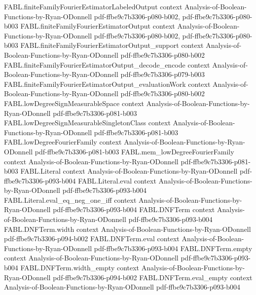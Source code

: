 \begin{theorem}
\proofstep
  {FABL.finiteFamilyFourierEstimatorLabeledOutput}
  {context}
  {Analysis-of-Boolean-Functions-by-Ryan-ODonnell}
  {pdf-ffbe9c7b3306-p080-b002,
    pdf-ffbe9c7b3306-p080-b003}
\proofstep
  {FABL.finiteFamilyFourierEstimatorOutput}
  {context}
  {Analysis-of-Boolean-Functions-by-Ryan-ODonnell}
  {pdf-ffbe9c7b3306-p080-b002,
    pdf-ffbe9c7b3306-p080-b003}
\proofstep
  {FABL.finiteFamilyFourierEstimatorOutput_support}
  {context}
  {Analysis-of-Boolean-Functions-by-Ryan-ODonnell}
  {pdf-ffbe9c7b3306-p080-b002}
\proofstep
  {FABL.finiteFamilyFourierEstimatorOutput_decode_encode}
  {context}
  {Analysis-of-Boolean-Functions-by-Ryan-ODonnell}
  {pdf-ffbe9c7b3306-p079-b003}
\proofstep
  {FABL.finiteFamilyFourierEstimatorOutput_evaluationWork}
  {context}
  {Analysis-of-Boolean-Functions-by-Ryan-ODonnell}
  {pdf-ffbe9c7b3306-p080-b002}
\proofstep
  {FABL.lowDegreeSignMeasurableSpace}
  {context}
  {Analysis-of-Boolean-Functions-by-Ryan-ODonnell}
  {pdf-ffbe9c7b3306-p081-b003}
\proofstep
  {FABL.lowDegreeSignMeasurableSingletonClass}
  {context}
  {Analysis-of-Boolean-Functions-by-Ryan-ODonnell}
  {pdf-ffbe9c7b3306-p081-b003}
\proofstep
  {FABL.lowDegreeFourierFamily}
  {context}
  {Analysis-of-Boolean-Functions-by-Ryan-ODonnell}
  {pdf-ffbe9c7b3306-p081-b003}
\proofstep
  {FABL.mem_lowDegreeFourierFamily}
  {context}
  {Analysis-of-Boolean-Functions-by-Ryan-ODonnell}
  {pdf-ffbe9c7b3306-p081-b003}
\proofstep
  {FABL.Literal}
  {context}
  {Analysis-of-Boolean-Functions-by-Ryan-ODonnell}
  {pdf-ffbe9c7b3306-p093-b004}
\proofstep
  {FABL.Literal.eval}
  {context}
  {Analysis-of-Boolean-Functions-by-Ryan-ODonnell}
  {pdf-ffbe9c7b3306-p093-b004}
\proofstep
  {FABL.Literal.eval_eq_neg_one_iff}
  {context}
  {Analysis-of-Boolean-Functions-by-Ryan-ODonnell}
  {pdf-ffbe9c7b3306-p093-b004}
\proofstep
  {FABL.DNFTerm}
  {context}
  {Analysis-of-Boolean-Functions-by-Ryan-ODonnell}
  {pdf-ffbe9c7b3306-p093-b004}
\proofstep
  {FABL.DNFTerm.width}
  {context}
  {Analysis-of-Boolean-Functions-by-Ryan-ODonnell}
  {pdf-ffbe9c7b3306-p094-b002}
\proofstep
  {FABL.DNFTerm.eval}
  {context}
  {Analysis-of-Boolean-Functions-by-Ryan-ODonnell}
  {pdf-ffbe9c7b3306-p093-b004}
\proofstep
  {FABL.DNFTerm.empty}
  {context}
  {Analysis-of-Boolean-Functions-by-Ryan-ODonnell}
  {pdf-ffbe9c7b3306-p093-b004}
\proofstep
  {FABL.DNFTerm.width_empty}
  {context}
  {Analysis-of-Boolean-Functions-by-Ryan-ODonnell}
  {pdf-ffbe9c7b3306-p094-b002}
\proofstep
  {FABL.DNFTerm.eval_empty}
  {context}
  {Analysis-of-Boolean-Functions-by-Ryan-ODonnell}
  {pdf-ffbe9c7b3306-p093-b004}
\proofstep

\end{theorem}
